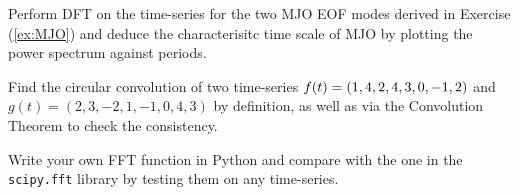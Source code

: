 \begin{Exercise}
Perform DFT on the time-series for the two MJO EOF modes derived in Exercise (\ref{ex:MJO}) and deduce the characterisitc time scale of MJO by plotting the power spectrum against periods.
\end{Exercise}

\begin{Exercise}
Find the circular convolution of two time-series $f(t) = (1,4,2,4, \\ 3,0,-1,2)$ and $g(t) = (2,3,-2,1,-1,0,4,3)$ by definition, as well as via the Convolution Theorem to check the consistency.
\end{Exercise}

\begin{Exercise}
Write your own FFT function in Python and compare with the one in the \verb|scipy.fft| library by testing them on any time-series.
\end{Exercise}